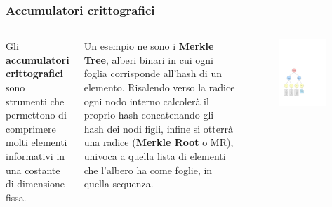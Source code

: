\documentclass{beamer}
\begin{document}
\begin{frame}
	\frametitle{Accumulatori crittografici}
	\begin{columns}
		Gli \textbf{accumulatori crittografici} sono strumenti che permettono
		di comprimere molti elementi informativi in una costante di dimensione fissa.
		
		Un esempio ne sono i \textbf{Merkle Tree}, alberi binari
		in cui ogni foglia corrisponde all'hash di un elemento.
		Risalendo verso la radice ogni nodo interno calcolerà il proprio hash
		concatenando gli hash dei nodi figli, infine si otterrà
		una radice (\textbf{Merkle Root} o MR), univoca
		a quella lista di elementi che l'albero
		ha come foglie, in quella sequenza.
		\begin{figure}
			\includegraphics[width=0.9\textwidth]{figures/mt1.pdf}
		\end{figure}
	\end{columns}
\end{frame}
\end{document}
